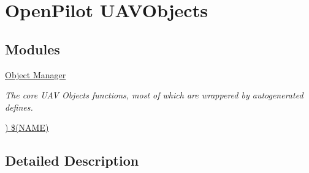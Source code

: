 \hypertarget{group___u_a_v_objects}{\section{Open\-Pilot U\-A\-V\-Objects}
\label{group___u_a_v_objects}
}
\subsection*{Modules}
\begin{DoxyCompactItemize}
\item 
\hyperlink{group___u_a_v}{Object Manager}
\begin{DoxyCompactList}\small\item\em The core U\-A\-V Objects functions, most of which are wrappered by autogenerated defines. \end{DoxyCompactList}\item 
\hyperlink{group___n_a_m_e}{) \$(\-N\-A\-M\-E)}
\begin{DoxyCompactList}\small\item\em \end{DoxyCompactList}\end{DoxyCompactItemize}


\subsection{Detailed Description}
